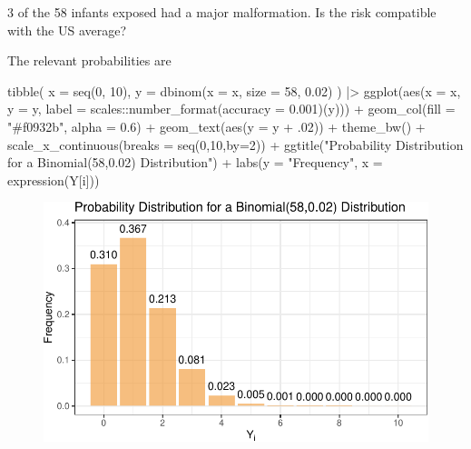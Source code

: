 \documentclass[
  letterpaper,
  DIV=11,
  numbers=noendperiod]{scrreport}
\newenvironment{Shaded}{\begin{snugshade}}{\end{snugshade}}
\newcommand{\AttributeTok}[1]{\textcolor[rgb]{0.40,0.45,0.13}{#1}}
\newcommand{\DecValTok}[1]{\textcolor[rgb]{0.68,0.00,0.00}{#1}}
\newcommand{\FloatTok}[1]{\textcolor[rgb]{0.68,0.00,0.00}{#1}}
\newcommand{\FunctionTok}[1]{\textcolor[rgb]{0.28,0.35,0.67}{#1}}
\newcommand{\NormalTok}[1]{\textcolor[rgb]{0.00,0.23,0.31}{#1}}
\newcommand{\SpecialCharTok}[1]{\textcolor[rgb]{0.37,0.37,0.37}{#1}}
\newcommand{\StringTok}[1]{\textcolor[rgb]{0.13,0.47,0.30}{#1}}
\begin{document}
3 of the 58 infants exposed had a major malformation. Is the risk
compatible with the US average?

The relevant probabilities are

\begin{Shaded}
\begin{Highlighting}[]
\FunctionTok{tibble}\NormalTok{(}
  \AttributeTok{x =} \FunctionTok{seq}\NormalTok{(}\DecValTok{0}\NormalTok{, }\DecValTok{10}\NormalTok{),}
  \AttributeTok{y =} \FunctionTok{dbinom}\NormalTok{(}\AttributeTok{x =}\NormalTok{ x, }\AttributeTok{size =} \DecValTok{58}\NormalTok{, }\FloatTok{0.02}\NormalTok{)}
\NormalTok{) }\SpecialCharTok{|\textgreater{}} 
\FunctionTok{ggplot}\NormalTok{(}\FunctionTok{aes}\NormalTok{(}\AttributeTok{x =}\NormalTok{ x, }\AttributeTok{y =}\NormalTok{ y, }\AttributeTok{label =}\NormalTok{ scales}\SpecialCharTok{::}\FunctionTok{number\_format}\NormalTok{(}\AttributeTok{accuracy =} \FloatTok{0.001}\NormalTok{)(y))) }\SpecialCharTok{+} 
\FunctionTok{geom\_col}\NormalTok{(}\AttributeTok{fill =} \StringTok{"\#f0932b"}\NormalTok{, }\AttributeTok{alpha =} \FloatTok{0.6}\NormalTok{) }\SpecialCharTok{+} 
\FunctionTok{geom\_text}\NormalTok{(}\FunctionTok{aes}\NormalTok{(}\AttributeTok{y =}\NormalTok{ y }\SpecialCharTok{+}\NormalTok{ .}\DecValTok{02}\NormalTok{)) }\SpecialCharTok{+} 
\FunctionTok{theme\_bw}\NormalTok{() }\SpecialCharTok{+} 
\FunctionTok{scale\_x\_continuous}\NormalTok{(}\AttributeTok{breaks =} \FunctionTok{seq}\NormalTok{(}\DecValTok{0}\NormalTok{,}\DecValTok{10}\NormalTok{,}\AttributeTok{by=}\DecValTok{2}\NormalTok{)) }\SpecialCharTok{+} 
\FunctionTok{ggtitle}\NormalTok{(}\StringTok{"Probability Distribution for a Binomial(58,0.02) Distribution"}\NormalTok{) }\SpecialCharTok{+} 
\FunctionTok{labs}\NormalTok{(}\AttributeTok{y =} \StringTok{"Frequency"}\NormalTok{, }\AttributeTok{x =} \FunctionTok{expression}\NormalTok{(Y[i]))}
\end{Highlighting}
\end{Shaded}

\begin{figure}[H]

{\centering \includegraphics{week8/week8_files/figure-pdf/unnamed-chunk-5-1.pdf}

}

\end{figure}
\end{document}
